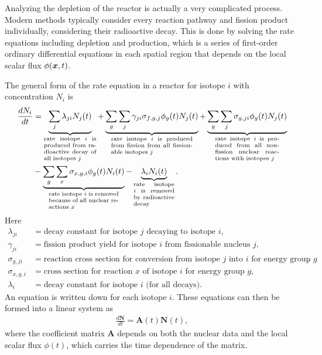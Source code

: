 Analyzing the depletion of the reactor is actually a very complicated process. Modern methods typically consider every reaction pathway and fission product individually, considering their radioactive decay. This is done by solving the rate equations including depletion and production, which is a series of first-order ordinary differential equations in each spatial region that depends on the local scalar flux $\phi(\bm{x},t)$. 

The general form of the rate equation in a reactor for isotope $i$ with concentration $N_i$ is
\begin{align}
  \frac{dN_i}{dt} &= 
  \underbrace{\sum_j \lambda_{ji} N_j(t) }_{\parbox{2.25cm}{\scriptsize rate isotope $i$ is produced from radioactive decay of all isotopes $j$}}
  + \underbrace{\sum_g \sum_j \gamma_{ji} \sigma_{f,g,j} \phi_g(t) N_j(t)}_{\parbox{3.5cm}{\scriptsize rate isotope $i$ is produced from fission from all fissionable isotopes $j$}}
  + \underbrace{\sum_g \sum_j \sigma_{g,ji} \phi_g(t) N_j(t)}_{\parbox{2.75cm}{\scriptsize rate isotope $i$ is produced from all non-fission nuclear reactions with isotopes $j$}} \nonumber \\*
  &- \underbrace{\sum_g \sum_x \sigma_{x,g,i} \phi_g(t) N_i(t)}_{\parbox{3cm}{\scriptsize rate isotope $i$ is removed because of all nuclear reactions $x$}}
  - \underbrace{\lambda_i N_i(t) }_{\parbox{1.75cm}{\scriptsize rate isotope $i$ is removed by radioactive decay}}.
\end{align}
Here
\begin{align}
  \lambda_{ji} &= \text{decay constant for isotope $j$ decaying to isotope $i$},  \nonumber \\
  \gamma_{ji}  &= \text{fission product yield for isotope $i$ from fissionable nucleus $j$}, \nonumber \\
  \sigma_{g,ji}  &= \text{reaction cross section for conversion from isotope $j$ into $i$ for energy group $g$}, \nonumber \\
  \sigma_{x,g,i} &= \text{cross section for reaction $x$ of isotope $i$ for energy group $g$}, \nonumber \\
  \lambda_i    &= \text{decay constant for isotope $i$ (for all decays)}. \nonumber 
\end{align}
An equation is written down for each isotope $i$. These equations can then be formed into a linear system as
\begin{align}
  \frac{d\mathbf{N}}{dt} = \mathbf{A}(t) \mathbf{N}(t) ,
\end{align}
where the coefficient matrix $\mathbf{A}$ depends on both the nuclear data and the local scalar flux $\phi(t)$, which carries the time dependence of the matrix.






